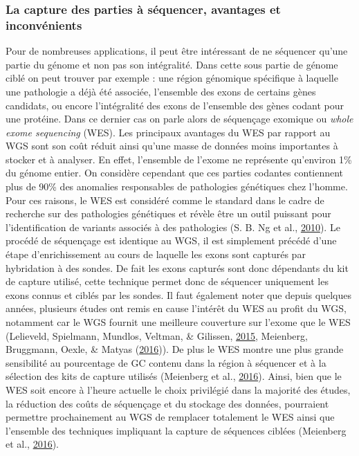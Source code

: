 \documentclass[12pt,twoside]{reedthesis}
\theoremstyle{definition}
\theoremstyle{definition}
\theoremstyle{remark}
\begin{document}
  \subsubsection{La capture des parties à séquencer, avantages et
  inconvénients}\label{la-capture-des-parties-a-sequencer-avantages-et-inconvenients}
  
  Pour de nombreuses applications, il peut être intéressant de ne
  séquencer qu'une partie du génome et non pas son intégralité. Dans cette
  sous partie de génome ciblé on peut trouver par exemple : une région
  génomique spécifique à laquelle une pathologie a déjà été associée,
  l'ensemble des exons de certains gènes candidats, ou encore
  l'intégralité des exons de l'ensemble des gènes codant pour une
  protéine. Dans ce dernier cas on parle alors de séquençage exomique ou
  \emph{whole exome sequencing} (WES). Les principaux avantages du WES par
  rapport au WGS sont son coût réduit ainsi qu'une masse de données moins
  importantes à stocker et à analyser. En effet, l'ensemble de l'exome ne
  représente qu'environ 1\% du génome entier. On considère cependant que
  ces parties codantes contiennent plus de 90\% des anomalies responsables
  de pathologies génétiques chez l'homme. Pour ces raisons, le WES est
  considéré comme le standard dans le cadre de recherche sur des
  pathologies génétiques et révèle être un outil puissant pour
  l'identification de variants associés à des pathologies (S. B. Ng et
  al., \protect\hyperlink{ref-Ng2010}{2010}). Le procédé de séquençage est
  identique au WGS, il est simplement précédé d'une étape d'enrichissement
  au cours de laquelle les exons sont capturés par hybridation à des
  sondes. De fait les exons capturés sont donc dépendants du kit de
  capture utilisé, cette technique permet donc de séquencer uniquement les
  exons connus et ciblés par les sondes. Il faut également noter que
  depuis quelques années, plusieurs études ont remis en cause l'intérêt du
  WES au profit du WGS, notamment car le WGS fournit une meilleure
  couverture sur l'exome que le WES (Lelieveld, Spielmann, Mundlos,
  Veltman, \& Gilissen, \protect\hyperlink{ref-Lelieveld2015}{2015},
  Meienberg, Bruggmann, Oexle, \& Matyas
  (\protect\hyperlink{ref-Meienberg2016}{2016})). De plus le WES montre
  une plus grande sensibilité au pourcentage de GC contenu dans la région
  à séquencer et à la sélection des kits de capture utilisés (Meienberg et
  al., \protect\hyperlink{ref-Meienberg2016}{2016}). Ainsi, bien que le
  WES soit encore à l'heure actuelle le choix privilégié dans la majorité
  des études, la réduction des coûts de séquençage et du stockage des
  données, pourraient permettre prochainement au WGS de remplacer
  totalement le WES ainsi que l'ensemble des techniques impliquant la
  capture de séquences ciblées (Meienberg et al.,
  \protect\hyperlink{ref-Meienberg2016}{2016}).
  
\end{document}
